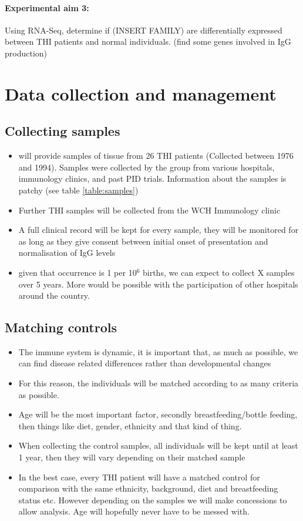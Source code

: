 \documentclass[12pt]{article}
\begin{document}
		\paragraph{Experimental aim 3:} Using RNA-Seq, determine if (INSERT FAMILY) are differentially expressed between THI patients and normal individuals. (find some genes involved in IgG production)

	\section{Data collection and management}
	
		\subsection{Collecting samples}
		
			\begin{itemize}
				\item \citet{Ovadia14} will provide samples of tissue from 26 THI patients (Collected between 1976 and 1994). Samples were collected by the group from various hospitals, immunology clinics, and past PID trials. Information about the samples is patchy (see table \ref{table:samples}) 
				\item Further THI samples will be collected from the WCH Immunology clinic
				\item A full clinical record will be kept for every sample, they will be monitored for as long as they give consent between initial onset of presentation and normalisation of IgG levels
				\item given that occurrence is 1 per 10$^6$ births, we can expect to collect X samples over 5 years. More would be possible with the participation of other hospitals around the country. 
			\end{itemize}
		
		\subsection{Matching controls} 
			
			\begin{itemize}
				\item The immune system is dynamic, it is important that, as much as possible, we can find disease related differences rather than developmental changes
				\item For this reason, the individuals will be matched according to as many criteria as possible. 
				\item Age will be the most important factor, secondly breastfeeding/bottle feeding, then things like diet, gender, ethnicity and that kind of thing. 
				\item When collecting the control samples, all individuals will be kept until at least 1 year, then they will vary depending on their matched sample
				\item In the best case, every THI patient will have a matched control for comparison with the same ethnicity, background, diet and breastfeeding status etc. However depending on the samples we will make concessions to allow analysis. Age will hopefully never have to be messed with.
			\end{itemize}
		
\end{document}
